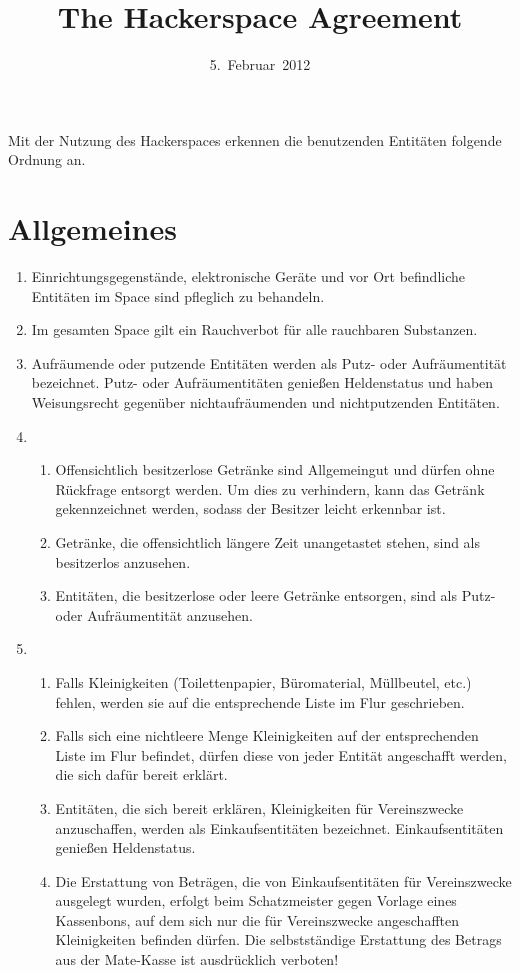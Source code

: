 \documentclass[12pt,a4paper]{scrartcl}
\title{The Hackerspace Agreement}
\date{5.~Februar~2012}
\begin{document}
\maketitle

\noindent Mit der Nutzung des Hackerspaces erkennen die benutzenden Entitäten
folgende Ordnung an.

\section{Allgemeines}
\begin{enumerate}
  \item Einrichtungsgegenstände, elektronische Geräte und vor Ort befindliche
    Entitäten im Space sind pfleglich zu behandeln.

  \item Im gesamten Space gilt ein Rauchverbot für alle rauchbaren Substanzen.

  \item Aufräumende oder putzende Entitäten werden als Putz- oder Aufräumentität
    bezeichnet. Putz- oder Aufräumentitäten genießen Heldenstatus und haben
    Weisungsrecht gegenüber nichtaufräumenden und nichtputzenden Entitäten.

  \item\begin{enumerate}
    \item Offensichtlich besitzerlose Getränke sind Allgemeingut und dürfen ohne
      Rückfrage entsorgt werden. Um dies zu verhindern, kann das Getränk
      gekennzeichnet werden, sodass der Besitzer leicht erkennbar ist.
    \item Getränke, die offensichtlich längere Zeit unangetastet stehen, sind
      als besitzerlos anzusehen.
    \item Entitäten, die besitzerlose oder leere Getränke entsorgen, sind als
      Putz- oder Aufräumentität anzusehen.
  \end{enumerate}

  \item\begin{enumerate}
    \item Falls Kleinigkeiten (Toilettenpapier, Büromaterial, Müllbeutel, etc.)
      fehlen, werden sie auf die entsprechende Liste im Flur geschrieben.
    \item Falls sich eine nichtleere Menge Kleinigkeiten auf der entsprechenden
      Liste im Flur befindet, dürfen diese von jeder Entität angeschafft werden,
      die sich dafür bereit erklärt.
    \item Entitäten, die sich bereit erklären, Kleinigkeiten für Vereinszwecke
      anzuschaffen, werden als Einkaufsentitäten bezeichnet. Einkaufsentitäten
      genießen Heldenstatus.
    \item Die Erstattung von Beträgen, die von Einkaufsentitäten für
      Vereinszwecke ausgelegt wurden, erfolgt beim Schatzmeister gegen Vorlage
      eines Kassenbons, auf dem sich nur die für Vereinszwecke angeschafften
      Kleinigkeiten befinden dürfen. Die selbstständige Erstattung des Betrags
      aus der Mate-Kasse ist ausdrücklich verboten!
  \end{enumerate}


\end{enumerate}
\end{document}
